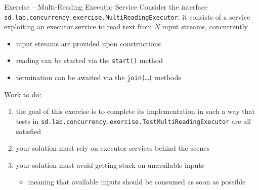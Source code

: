 \documentclass[presentation]{beamer}\mode<presentation>{\usetheme{AMSBolognaFC}}
\begin{document}
\begin{frame}[c]{Exercise \currentExercise{} -- Multi-Reading Executor Service}
    Consider the interface \texttt{sd.lab.concurrency.exercise.\alert{MultiReadingExecutor}}: it consists of a service exploiting an executor service to read text from $N$ input streams, \alert{concurrently}
    \begin{itemize}
        \item input streams are provided upon constructions
        \item reading can be started via the \texttt{start()} method
        \item termination can be awaited via the \texttt{join(\ldots)} methods
    \end{itemize}

    \bigskip
    
    Work to do:
    \begin{enumerate}
        \item the goal of this exercise is to complete its implementation in such a way that tests in \texttt{sd.lab\allowbreak{}.concurrency\allowbreak{}.exercise\allowbreak{}.\alert{TestMultiReadingExecutor}}
        are all satisfied

        \item your solution \alert{must} rely on executor services behind the scenes

        \item your solution \alert{must avoid} getting stuck on unavailable inputs
        \begin{itemize}
            \item meaning that available inputs should be consumed as soon as possible
        \end{itemize}
    \end{enumerate}

\end{frame}

\section*{}

\frame{\titlepage}
\end{document}
